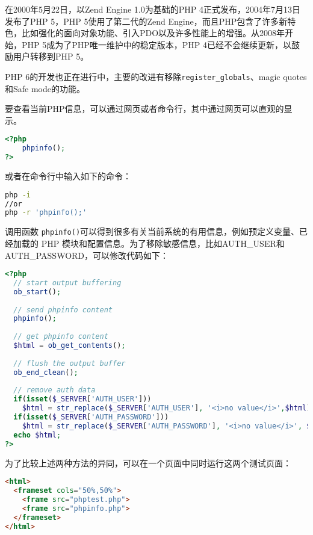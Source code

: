 在2000年5月22日，以Zend Engine 1.0为基础的PHP 4正式发布，2004年7月13日发布了PHP 5，PHP 5使用了第二代的Zend Engine，而且PHP包含了许多新特色，比如强化的面向对象功能、引入PDO以及许多性能上的增强。从2008年开始，PHP 5成为了PHP唯一维护中的稳定版本，PHP 4已经不会继续更新，以鼓励用户转移到PHP 5。

PHP 6的开发也正在进行中，主要的改进有移除\texttt{register\_globals}、magic quotes和Safe mode的功能。


要查看当前PHP信息，可以通过网页或者命令行，其中通过网页可以直观的显示。

\begin{lstlisting}[language=PHP]
<?php
	phpinfo();
?>
\end{lstlisting}

或者在命令行中输入如下的命令：

\begin{lstlisting}[language=bash]
php -i
//or
php -r 'phpinfo();'
\end{lstlisting}

调用函数 \texttt{phpinfo()}可以得到很多有关当前系统的有用信息，例如预定义变量、已经加载的 PHP 模块和配置信息。为了移除敏感信息，比如AUTH\_USER和AUTH\_PASSWORD，可以修改代码如下：

\begin{lstlisting}[language=PHP]
<?php
  // start output buffering
  ob_start();
  
  // send phpinfo content
  phpinfo();
  
  // get phpinfo content
  $html = ob_get_contents();
  
  // flush the output buffer
  ob_end_clean();
  
  // remove auth data
  if(isset($_SERVER['AUTH_USER']))
    $html = str_replace($_SERVER['AUTH_USER'], '<i>no value</i>',$html);
  if(isset($_SERVER['AUTH_PASSWORD']))
    $html = str_replace($_SERVER['AUTH_PASSWORD'], '<i>no value</i>', $html);
  echo $html;
?>
\end{lstlisting}

为了比较上述两种方法的异同，可以在一个页面中同时运行这两个测试页面：

\begin{lstlisting}[language=HTML]
<html>
  <frameset cols="50%,50%">
    <frame src="phptest.php">
    <frame src="phpinfo.php">
  </frameset>
</html>
\end{lstlisting}



















